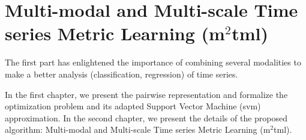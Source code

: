 \part{Multi-modal and Multi-scale Time series Metric Learning ({\sc m$^2$tml})}
The first part has enlightened the importance of combining several modalities to make a better analysis (classification, regression) of time series.

In the first chapter, we present the pairwise representation and formalize the optimization problem and its adapted Support Vector Machine ({\sc svm}) approximation. In the second chapter, we present the details of the proposed algorithm: Multi-modal and Multi-scale Time series Metric Learning ({\sc m$^2$tml}). 

